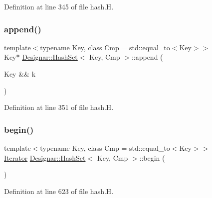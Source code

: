 Definition at line 345 of file hash.\+H.

\mbox{\label{class_designar_1_1_hash_set_a12748f202f35b968b2aace2ebe202f17}} 
\subsubsection{\texorpdfstring{append()}{append()}\hspace{0.1cm}{\footnotesize\ttfamily [2/2]}}
{\footnotesize\ttfamily template$<$typename Key, class Cmp = std\+::equal\+\_\+to$<$\+Key$>$$>$ \\
Key$\ast$ \hyperlink{class_designar_1_1_hash_set}{Designar\+::\+Hash\+Set}$<$ Key, Cmp $>$\+::append (\begin{DoxyParamCaption}\item[{Key \&\&}]{k }\end{DoxyParamCaption})\hspace{0.3cm}{\ttfamily [inline]}}



Definition at line 351 of file hash.\+H.

\mbox{\label{class_designar_1_1_hash_set_a4fd373db1c3035e5833b59fb6cb1656b}} 
\subsubsection{\texorpdfstring{begin()}{begin()}\hspace{0.1cm}{\footnotesize\ttfamily [1/2]}}
{\footnotesize\ttfamily template$<$typename Key, class Cmp = std\+::equal\+\_\+to$<$\+Key$>$$>$ \\
\hyperlink{class_designar_1_1_hash_set_1_1_iterator}{Iterator} \hyperlink{class_designar_1_1_hash_set}{Designar\+::\+Hash\+Set}$<$ Key, Cmp $>$\+::begin (\begin{DoxyParamCaption}{ }\end{DoxyParamCaption})\hspace{0.3cm}{\ttfamily [inline]}}



Definition at line 623 of file hash.\+H.

